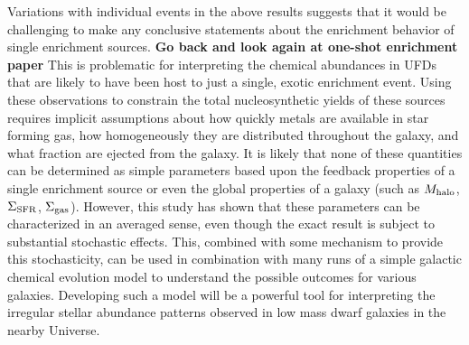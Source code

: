 Variations with individual events in the above results suggests that it would be challenging to make any conclusive statements about the enrichment behavior of single enrichment sources. \textbf{Go back and look again at one-shot enrichment paper} This is problematic for interpreting the chemical abundances in UFDs that are likely to have been host to just a single, exotic enrichment event. Using these observations to constrain the total nucleosynthetic yields of these sources requires implicit assumptions about how quickly metals are available in star forming gas, how homogeneously they are distributed throughout the galaxy, and what fraction are ejected from the galaxy. It is likely that none of these quantities can be determined as simple parameters based upon the feedback properties of a single enrichment source or even the global properties of a galaxy (such as $M_{\rm halo}$, $\Sigma_{\rm SFR}$, $\Sigma_{\rm gas}$). However, this study has shown that these parameters can be characterized in an averaged sense, even though the exact result is subject to substantial stochastic effects. This, combined with some mechanism to provide this stochasticity, can be used in combination with many runs of a simple galactic chemical evolution model to understand the possible outcomes for various galaxies. Developing such a model will be a powerful tool for interpreting the irregular stellar abundance patterns observed in low mass dwarf galaxies in the nearby Universe.




\setcounter{section}{0}%
\renewcommand\thesection{\thechapter.\Alph{section}}

%
%

\renewcommand\thesection{\thechapter.\arabic{section}}
